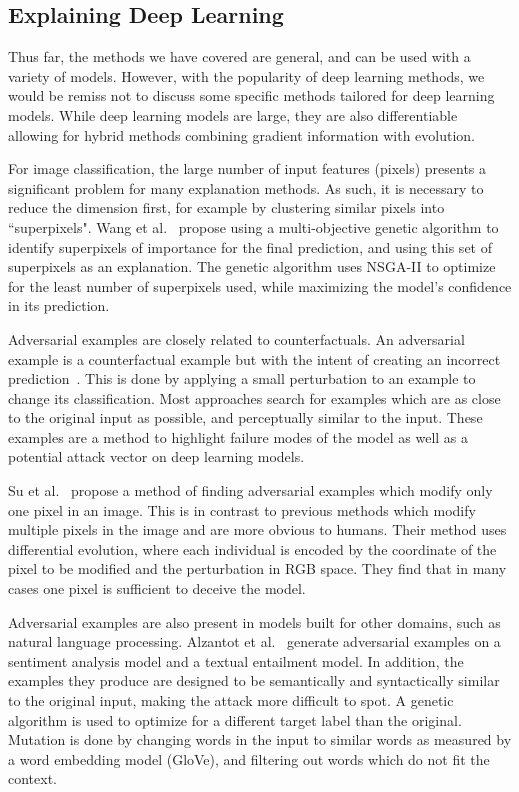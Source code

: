 \documentclass[graybox]{svmult}
\begin{document}
\subsection{Explaining Deep Learning}

Thus far, the methods we have covered are general, and can be used with a variety of models. However, with the popularity of deep learning methods, we would be remiss not to discuss some specific methods tailored for deep learning models. While deep learning models are large, they are also differentiable allowing for hybrid methods combining gradient information with evolution.

For image classification, the large number of input features (pixels) presents a significant problem for many explanation methods. As such, it is necessary to reduce the dimension first, for example by clustering similar pixels into ``superpixels". 
Wang et al.~\cite{wangMultiobjectiveGeneticAlgorithm2022} propose using a multi-objective genetic algorithm to identify superpixels of importance for the final prediction, and using this set of superpixels as an explanation. The genetic algorithm uses NSGA-II to optimize for the least number of superpixels used, while maximizing the model's confidence in its prediction.

Adversarial examples are closely related to counterfactuals. An adversarial example is a counterfactual example but with the intent of creating an incorrect prediction~\cite{IML_eBook_Molnar_22}. This is done by applying a small perturbation to an example to change its classification. Most approaches search for examples which are as close to the original input as possible, and perceptually similar to the input. These examples are a method to highlight failure modes of the model as well as a potential attack vector on deep learning models.

Su et al.~\cite{suOnePixelAttack2019} propose a method of finding adversarial examples which modify only one pixel in an image. This is in contrast to previous methods which modify multiple pixels in the image and are more obvious to humans. Their method uses differential evolution, where each individual is encoded by the coordinate of the pixel to be modified and the perturbation in RGB space. They find that in many cases one pixel is sufficient to deceive the model.

Adversarial examples are also present in models built for other domains, such as natural language processing. Alzantot et al.~\cite{alzantotGeneratingNaturalLanguage2018} generate adversarial examples on a sentiment analysis model and a textual entailment model. In addition, the examples they produce are designed to be semantically and syntactically similar to the original input, making the attack more difficult to spot. A genetic algorithm is used to optimize for a different target label than the original. Mutation is done by changing words in the input to similar words as measured by a word embedding model (GloVe), and filtering out words which do not fit the context.
\end{document}
